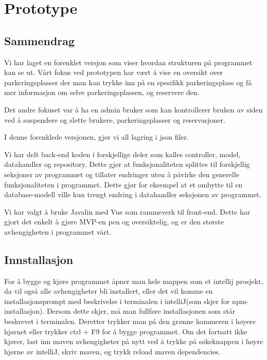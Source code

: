\documentclass[12pt]{article}
\begin{document}
%
%

\section{Prototype}

    \subsection{Sammendrag}
    Vi har laget en forenklet versjon som viser hvordan strukturen på programmet kan se ut. Vårt fokus ved prototypen har vært å vise en oversikt over parkeringsplasser der man kan trykke inn på en spesifikk parkeringsplass og få mer informasjon om selve parkeringsplassen, og reservere den. 

    Det andre fokuset var å ha en admin bruker som kan kontrollerer bruken av siden ved å suspendere og slette brukere, parkeringsplasser og reservasjoner.

    I denne forenklede versjonen, gjør vi all lagring i json filer.

    Vi har delt back-end koden i forskjellige deler som kalles controller, model, datahandler og repository. Dette gjør at funksjonaliteten splittes til forskjellig seksjoner av programmet og tillater endringer uten å påvirke den generelle funksjonaliteten i programmet. Dette gjør for eksempel at et ombytte til en database-modell ville kun trengt endring i datahandler seksjonen av programmet.

    Vi har valgt å bruke Javalin med Vue som rammeverk til front-end. Dette har gjort det enkelt å gjøre MVP-en pen og oversiktelig, og er den største avhengigheten i programmet vårt.

    \subsection{Innstallasjon}
    For å bygge og kjøre programmet åpner man hele mappen som et intellij prosjekt, da vil også alle avhengigheter bli installert, eller det vil komme en installasjonsprompt med beskrivelse i terminalen i  intelliJ(som skjer for npm-installasjon). Dersom dette skjer, må man fullføre installasjonen som står beskrevet i terminalen. Deretter trykker man på den grønne hammeren i høyere hjørnet eller trykker ctrl + F9 for å bygge programmet. Om det fortsatt ikke kjører, last inn maven avhengigheter på nytt ved å trykke på søkeknappen i høyre hjørne av intelliJ, skriv maven, og trykk reload maven dependencies.
\end{document}
